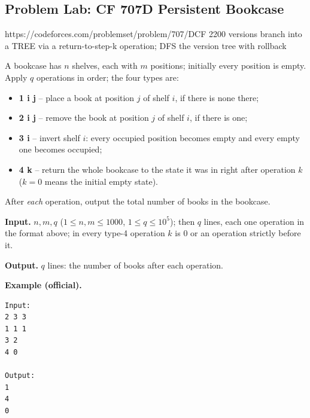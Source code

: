 \subsection{Problem Lab: CF 707D Persistent Bookcase}

  {https://codeforces.com/problemset/problem/707/D}{CF 2200}
  {versions branch into a TREE via a return-to-step-k operation; DFS the version tree with rollback}

\begin{problemstatement}
A bookcase has \(n\) shelves, each with \(m\) positions; initially every position is empty.  Apply \(q\) operations in order; the four types are:
\begin{itemize}[nosep,leftmargin=1.4em]
  \item \textbf{1 i j} -- place a book at position \(j\) of shelf \(i\), if there is none there;
  \item \textbf{2 i j} -- remove the book at position \(j\) of shelf \(i\), if there is one;
  \item \textbf{3 i} -- invert shelf \(i\): every occupied position becomes empty and every empty one becomes occupied;
  \item \textbf{4 k} -- return the whole bookcase to the state it was in right after operation \(k\) (\(k=0\) means the initial empty state).
\end{itemize}
After \emph{each} operation, output the total number of books in the bookcase.

\textbf{Input.} \(n, m, q\) (\(1\le n,m\le 1000\), \(1\le q\le 10^5\)); then \(q\) lines, each one operation in the format above; in every type-4 operation \(k\) is \(0\) or an operation strictly before it.

\textbf{Output.} \(q\) lines: the number of books after each operation.

\textbf{Example (official).}
\begin{verbatim}
Input:
2 3 3
1 1 1
3 2
4 0

Output:
1
4
0
\end{verbatim}
\end{problemstatement}

